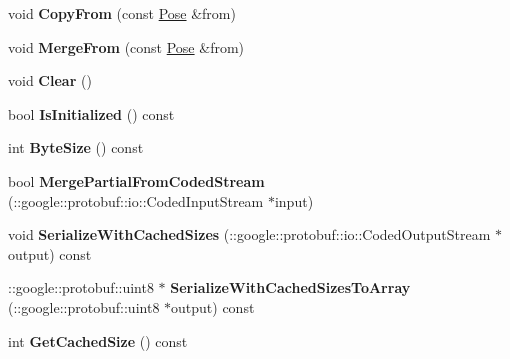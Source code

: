 \begin{DoxyCompactItemize}
\item 
void {\bfseries Copy\+From} (const \hyperlink{classvss__state_1_1Pose}{Pose} \&from)\hypertarget{classvss__state_1_1Pose_a29467f35bd2186cb7e781eea648a8c3b}{}\label{classvss__state_1_1Pose_a29467f35bd2186cb7e781eea648a8c3b}

\item 
void {\bfseries Merge\+From} (const \hyperlink{classvss__state_1_1Pose}{Pose} \&from)\hypertarget{classvss__state_1_1Pose_a679b672f248c7a53c203465eb3dca328}{}\label{classvss__state_1_1Pose_a679b672f248c7a53c203465eb3dca328}

\item 
void {\bfseries Clear} ()\hypertarget{classvss__state_1_1Pose_a57b811afbc5889b23ad1713684619132}{}\label{classvss__state_1_1Pose_a57b811afbc5889b23ad1713684619132}

\item 
bool {\bfseries Is\+Initialized} () const \hypertarget{classvss__state_1_1Pose_a06a7663fb631cbc15bbdccb88d42d835}{}\label{classvss__state_1_1Pose_a06a7663fb631cbc15bbdccb88d42d835}

\item 
int {\bfseries Byte\+Size} () const \hypertarget{classvss__state_1_1Pose_a96e59891029ae382fd88854eea96b223}{}\label{classvss__state_1_1Pose_a96e59891029ae382fd88854eea96b223}

\item 
bool {\bfseries Merge\+Partial\+From\+Coded\+Stream} (\+::google\+::protobuf\+::io\+::\+Coded\+Input\+Stream $\ast$input)\hypertarget{classvss__state_1_1Pose_aad871e3c8d77d794b785e512d60e440c}{}\label{classvss__state_1_1Pose_aad871e3c8d77d794b785e512d60e440c}

\item 
void {\bfseries Serialize\+With\+Cached\+Sizes} (\+::google\+::protobuf\+::io\+::\+Coded\+Output\+Stream $\ast$output) const \hypertarget{classvss__state_1_1Pose_af1e240831f2cb26edfc3d2f9bc4583d4}{}\label{classvss__state_1_1Pose_af1e240831f2cb26edfc3d2f9bc4583d4}

\item 
\+::google\+::protobuf\+::uint8 $\ast$ {\bfseries Serialize\+With\+Cached\+Sizes\+To\+Array} (\+::google\+::protobuf\+::uint8 $\ast$output) const \hypertarget{classvss__state_1_1Pose_a9c71c9e72bda4ba9223e7336d02ad763}{}\label{classvss__state_1_1Pose_a9c71c9e72bda4ba9223e7336d02ad763}

\item 
int {\bfseries Get\+Cached\+Size} () const \hypertarget{classvss__state_1_1Pose_a97a32d12afefa90b01e0b6ed6713bb18}{}\label{classvss__state_1_1Pose_a97a32d12afefa90b01e0b6ed6713bb18}


\end{DoxyCompactItemize}
